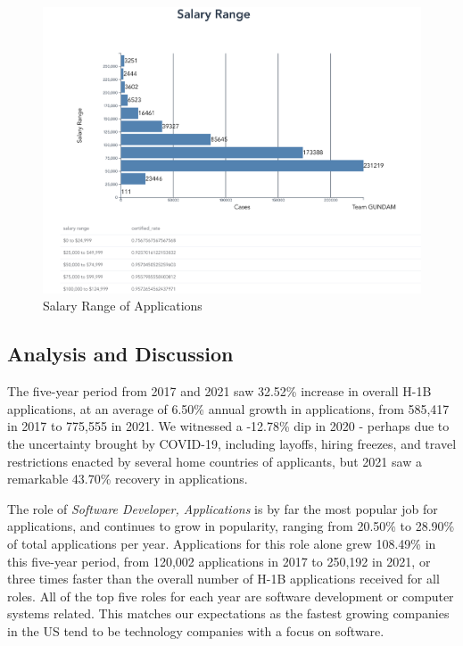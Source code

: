 \documentclass[sigconf]{acmart}
\begin{document}
\begin{figure}
  \includegraphics[width=\linewidth]{salary_range.png}
  \caption{Salary Range of Applications}
  \label{fig:salaryrange}
\end{figure}


\subsection{Analysis and Discussion}

The five-year period from 2017 and 2021 saw 32.52\% increase in overall H-1B applications, 
at an average of 6.50\% annual growth in applications, 
from 585,417 in 2017 to 775,555 in 2021. We witnessed a -12.78\% dip in 2020 - perhaps due to the 
uncertainty brought by COVID-19, including layoffs, hiring freezes, and travel restrictions 
enacted by several home countries of applicants, but 2021 saw a remarkable 43.70\% recovery in applications. 

The role of \textit{Software Developer, Applications} is by far the most popular job for applications, 
and continues to grow in popularity, ranging from 20.50\% to 28.90\% of total applications per year. 
Applications for this role alone grew 108.49\% in this five-year period,
 from 120,002 applications in 2017 to 250,192 in 2021, 
or three times faster than the overall number of H-1B applications received for all roles. 
All of the top five roles for each year are software development or computer systems related. 
This matches our expectations as the fastest growing companies in the US tend to be technology companies 
with a focus on software. 
\end{document}
